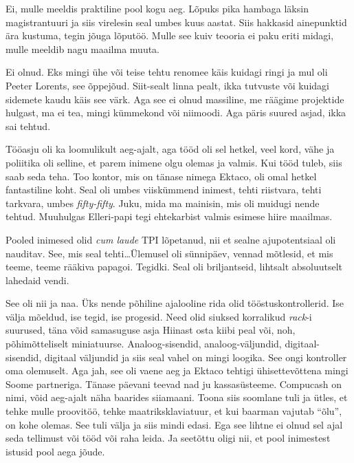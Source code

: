 
Ei, mulle meeldis praktiline pool kogu aeg. Lõpuks pika hambaga läksin magistrantuuri ja siis virelesin seal umbes kuus aastat. Siis hakkasid ainepunktid  ära kustuma, tegin jõuga lõputöö. Mulle see kuiv teooria ei paku eriti midagi, mulle meeldib nagu maailma muuta. 


Ei olnud. Eks mingi ühe või teise tehtu renomee käis kuidagi ringi ja mul oli Peeter Lorents, see õppejõud. Siit-sealt linna pealt,  ikka tutvuste  või kuidagi sidemete kaudu käis see värk. Aga see ei olnud massiline, me räägime projektide hulgast, ma ei tea, mingi kümmekond või niimoodi. Aga päris suured asjad, ikka sai tehtud.

Tööasju oli ka loomulikult aeg-ajalt, aga tööd oli sel hetkel, veel kord, vähe ja poliitika oli selline, et parem inimene olgu olemas ja valmis. Kui tööd tuleb, siis saab seda teha. Too  kontor, mis on tänase nimega Ektaco, oli omal hetkel  fantastiline koht. Seal oli umbes viiskümmend inimest, tehti riistvara, tehti tarkvara, umbes \emph{fifty-fifty}. Juku, mida ma mainisin, mis oli muidugi nende tehtud. Muuhulgas Elleri-papi tegi ehtekarbist valmis esimese hiire maailmas.

Pooled inimesed olid \emph{cum laude} TPI lõpetanud, nii et sealne ajupotentsiaal oli nauditav. See, mis seal tehti\ldots Ülemusel oli sünnipäev, vennad mõtlesid, et mis teeme, teeme rääkiva papagoi. Tegidki. Seal oli briljantseid, lihtsalt absoluutselt lahedaid vendi. 


See oli nii ja naa. Üks nende põhiline ajalooline rida olid tööstuskontrollerid. Ise välja mõeldud, ise tegid, ise progesid. Need olid siuksed korralikud \emph{rack}-i suurused, täna võid samasuguse asja  Hiinast osta kiibi peal või, noh, põhimõtteliselt miniatuurse. Analoog-sisendid, analoog-väljundid, digitaal-sisendid, digitaal väljundid ja siis seal vahel on mingi loogika. See ongi kontroller oma olemuselt. Aga jah, see oli vaene aeg ja  Ektaco tehtigi ühisettevõttena mingi Soome partneriga. Tänase päevani teevad nad ju kassasüsteeme. Compucash on nimi, võid aeg-ajalt näha baarides siiamaani. Toona siis soomlane tuli ja ütles, et tehke mulle proovitöö, tehke  maatriksklaviatuur, et kui baarman vajutab \enquote{õlu}, on kohe olemas. See tuli välja ja siis mindi edasi. Ega see lihtne ei olnud sel ajal seda tellimust või tööd või raha leida. Ja  seetõttu oligi nii, et pool inimestest istusid pool  aega jõude. 

